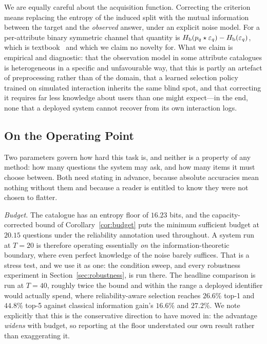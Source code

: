 We are equally careful about the acquisition function. Correcting the
criterion means replacing the entropy of the induced split with the mutual
information between the target and the \emph{observed} answer, under an
explicit noise model. For a per-attribute binary symmetric channel that
quantity is $H_{\mathrm{b}}(p_q \star \varepsilon_q) - H_{\mathrm{b}}(\varepsilon_q)$, which is
textbook~\cite[Ch.~7]{cover2006} and which we claim no novelty for. What we
claim is empirical and diagnostic: that the observation model in some
attribute catalogues is heterogeneous in a specific and unfavourable way, that
this is partly an artefact of preprocessing rather than of the domain, that a
learned selection policy trained on simulated interaction inherits the same
blind spot, and that correcting it requires far less knowledge about users
than one might expect---in the end, none that a deployed system cannot recover
from its own interaction logs.

\subsection{On the Operating Point}

Two parameters govern how hard this task is, and neither is a property of any
method: how many questions the system may ask, and how many items it must
choose between. Both need stating in advance, because absolute accuracies mean
nothing without them and because a reader is entitled to know they were not
chosen to flatter.

\emph{Budget.} The catalogue has an entropy floor of $16.23$ bits, and the
capacity-corrected bound of Corollary~\ref{cor:budget} puts the minimum
sufficient budget at $20.15$ questions under the reliability annotation used
throughout. A system run at $T=20$ is therefore operating essentially
\emph{on} the information-theoretic boundary, where even perfect knowledge of
the noise barely suffices. That is a stress test, and we use it as one: the
condition sweep, and every robustness experiment in
Section~\ref{sec:robustness}, is run there. The headline comparison is run at
$T=40$, roughly twice the bound and within the range a deployed identifier
would actually spend, where reliability-aware selection reaches $26.6\%$ top-1
and $44.8\%$ top-5 against classical information gain's $16.6\%$ and $27.2\%$.
We note explicitly that this is the conservative direction to have moved in:
the advantage \emph{widens} with budget, so reporting at the floor understated
our own result rather than exaggerating it.

